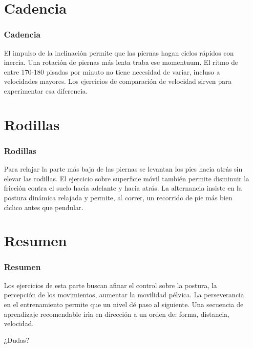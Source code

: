 \documentclass{beamer}
\begin{document}
\section{Cadencia}
\begin{frame}
\frametitle{Cadencia}
El impulso de la inclinación permite que las piernas hagan      
 ciclos rápidos con inercia. Una rotación de piernas más lenta
 traba ese momentuum. El ritmo de entre 170-180 pisadas
 por minuto no tiene necesidad de variar, incluso a
 velocidades mayores. Los ejercicios de comparación de
 velocidad sirven para experimentar esa diferencia.
\end{frame}

\section{Rodillas}
\begin{frame}
\frametitle{Rodillas}
Para relajar la parte más baja de las piernas se levantan los   
 pies hacia atrás sin elevar las rodillas. El ejercicio sobre
 superficie móvil también permite disminuir la fricción contra
 el suelo hacia adelante y hacia atrás. La alternancia insiste
 en la postura dinámica relajada y permite, al correr, un
 recorrido de pie más bien cı́clico antes que pendular.
\end{frame}

\section{Resumen}
\begin{frame}
\frametitle{Resumen}
Los ejercicios de esta parte buscan afinar el control sobre la
 postura, la percepción de los movimientos, aumentar la
 movilidad pélvica. La perseverancia en el entrenamiento
 permite que un nivel dé paso al siguiente. Una secuencia de
 aprendizaje recomendable irı́a en dirección a un orden de:
 forma, distancia, velocidad.
\end{frame}


\begin{frame}
\Huge{\centerline{¿Dudas?}}
\end{frame}

\end{document}
